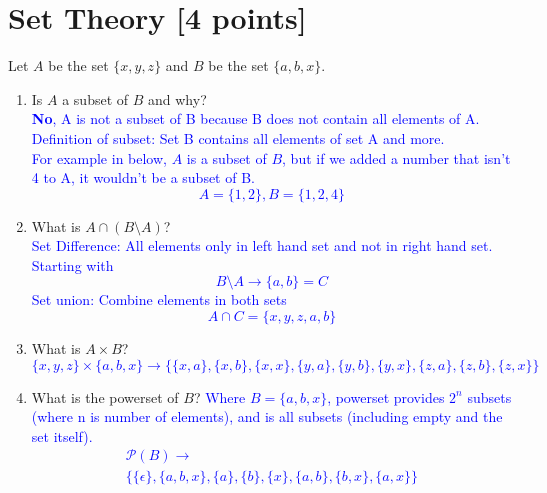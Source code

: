 

\author{
\textsc{\thecurrentsemester} \hspace{3cm}\myduedate
}
\title{\mytitle}
\date{}
\maketitle

\thispagestyle{firststyle}

\vspace{-0.5cm}
\noindent\makebox[\linewidth]{\rule{\columnwidth}{2pt}}



\newpage
\section{Set Theory [4 points]}
Let $A$ be the set $\{x, y, z\}$ and $B$ be the set $\{a, b, x\}$.
\begin{enumerate}[label=(\roman*)]
\item Is $A$ a subset of $B$ and why?
\textcolor{blue}{
\\\textbf{No}, A is not a subset of B because B does not contain all elements of A. 
Definition of subset: Set B contains all elements of set A and more. \\For example in below, $A$ is a subset of $B$, but if we added a number that isn't 4 to A, it wouldn't be a subset of B.
$$A=\{1,2\},B=\{1,2,4\}$$
}
\item What is $A\cap (B \setminus A)$?
\textcolor{blue}{
\\Set Difference: All elements only in left hand set and not in right hand set.
\\Starting with 
$$B \setminus A \rightarrow \{ a,b\}=C$$
Set union: Combine elements in both sets
$$
A \cap C= \boxed{\{x,y,z,a,b \}}
$$
}
\item What is $A \times B$? %
\textcolor{blue}{
$$
\{x, y, z\} \times \{a, b, x\}\rightarrow 
\{ 
\{x,a \},
\{x,b \},
\{x,x \},
\{y,a \},
\{y,b \},
\{y,x \},
\{z,a \},
\{z,b \},
\{z,x \}
\}
$$
}

\item What is the powerset of $B$?
\textcolor{blue}{
Where $B=\{a, b, x\}$, powerset provides $2^n$ subsets (where n is number of elements), and is all subsets (including empty and the set itself).
\begin{gather*}
\mathcal{P} (B)\rightarrow \\ \{
\{\epsilon \},%
\{a, b, x\},
\{a \},
\{b \},
\{x \},
\{a,b \},
\{b,x \},
\{a,x \}
\}
\end{gather*}
}
\end{enumerate}

